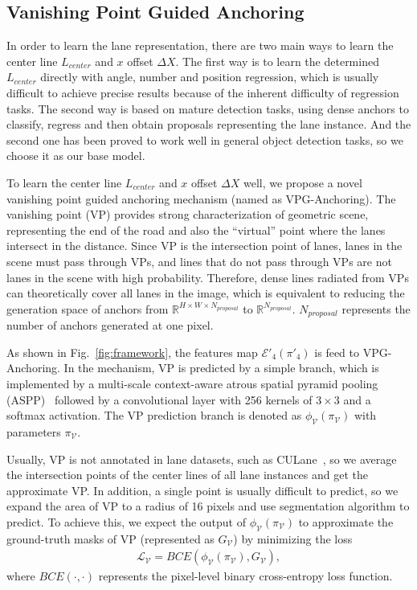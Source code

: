 \documentclass{article}
\begin{document}
\subsection{Vanishing Point Guided Anchoring}
In order to learn the lane representation, there are two main ways to learn the center line $L_{center}$ and $x$ offset $\Delta X$. The first way is to learn the determined $L_{center}$ directly with angle, number and position regression, which is usually difficult to achieve precise results because of the inherent difficulty of regression tasks. The second way is based on mature detection tasks, using dense anchors to classify,  regress and then obtain proposals representing the lane instance. And the second one has been proved to work well in general object detection tasks, so we choose it as our base model. 

To learn the center line $L_{center}$ and $x$ offset $\Delta X$ well, we propose a novel vanishing point guided anchoring mechanism (named as VPG-Anchoring). The vanishing point (VP) provides strong characterization of geometric scene, representing the end of the road and also the ``virtual'' point where the lanes intersect in the distance. Since VP is the intersection point of lanes, lanes in the scene must pass through VPs, and lines that do not pass through VPs are not lanes in the scene with high probability. Therefore, dense lines radiated from VPs can theoretically cover all lanes in the image, which is equivalent to reducing the generation space of anchors from $\mathbb{R}^{H \times W \times N_{proposal}}$ to $\mathbb{R}^{N_{proposal}}$. $N_{proposal}$ represents the number of anchors generated at one pixel.

As shown in Fig.~\ref{fig:framework}, the features map $\mathcal{E}'_4(\pi'_4)$ is feed to VPG-Anchoring. In the mechanism, VP is predicted by a simple branch, which is implemented by a multi-scale context-aware atrous spatial pyramid pooling (ASPP)~\cite{chen2018encoder} followed by a convolutional layer with 256 kernels of $3 \times 3$ and a softmax activation. The VP prediction branch is denoted as $\phi_{\mathcal{V}}({\pi_\mathcal{V}})$ with parameters $\pi_\mathcal{V}$.

Usually, VP is not annotated in lane datasets, such as CULane~\cite{pan2018spatial}, so we average the intersection points of the center lines of all lane instances and get the approximate VP. In addition, a single point is usually difficult to predict, so we expand the area of VP to a radius of 16 pixels and use segmentation algorithm to predict. To achieve this, we expect the output of $\phi_{\mathcal{V}}({\pi_\mathcal{V}})$ to approximate the ground-truth masks of VP (represented as $G_{\mathcal{V}}$) by minimizing the loss
\begin{equation}\label{eq:vp_loss}
\begin{aligned}
{\mathcal{L}}_{\mathcal{V}} = BCE(\phi_{\mathcal{V}}({\pi_\mathcal{V}}), G_{\mathcal{V}}),
\end{aligned}
\end{equation}
where $BCE(\cdot,\cdot)$ represents the pixel-level binary cross-entropy loss function.
\end{document}
